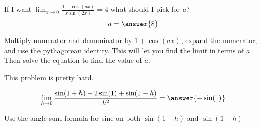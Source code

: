 \documentclass[handout]{ximera}
\begin{document}
\begin{exercise}
If I want $\lim_{x \to 0} \frac{1-\cos(ax)}{x\sin(2x)} = 4$ what should I pick for $a$?
	\[a = \answer{8}\]
	\begin{hint}
		Multiply numerator and denominator by $1+\cos(ax)$, expand the numerator, and use the pythagorean identity.  This will let you find the limit in terms of $a$.  Then solve the equation to find the value of $a$.
	\end{hint}
\end{exercise}

\begin{exercise}
	\begin{warning}
		This problem is pretty hard.
	\end{warning}
	\[\lim_{h \to 0} \frac{\sin(1+h) - 2\sin(1)+\sin(1-h)}{h^2} = \answer{-\sin(1)}\]
	\begin{hint}
		Use the angle sum formula for sine on both $\sin(1+h)$ and $\sin(1-h)$
	\end{hint}
\end{exercise}
\end{document}
